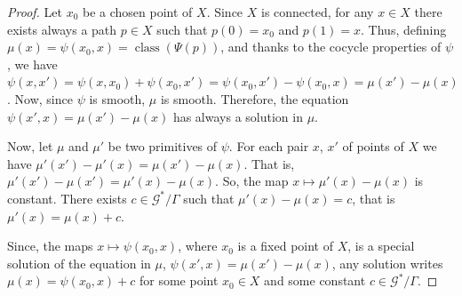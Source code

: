 \documentclass[10pt,reqno,twoside]{amsart}
\newcommand{\cG}{\mathcal{G}}
\DeclareMathOperator{\class}{class}
\theoremstyle{plain}
\theoremstyle{definition}
\begin{document}
  \begin{proof}
    Let $x_0$ be a chosen point of $X$.
    Since $X$ is connected,
    for any $x \in X$ there exists always a path $p \in X$ such that $p(0) = x_0$ and $p(1) = x$.
    Thus,
    defining $\mu(x) = \psi(x_0,x) = \class(\Psi(p))$,
    and thanks to the cocycle properties of $\psi$,
    we have $\psi(x,x') = \psi(x,x_0) + \psi(x_0,x') = \psi(x_0,x') - \psi(x_0,x) = \mu(x') - \mu(x)$.
    Now,
    since $\psi$ is smooth,
    $\mu$ is smooth.
    Therefore,
    the equation $\psi(x',x) = \mu(x') - \mu(x)$ has always a solution in $\mu$.
    
    Now,
    let $\mu$ and $\mu'$ be two primitives of $\psi$.
    For each pair $x$, $x'$ of points of $X$ we have $\mu'(x') - \mu'(x) = \mu(x') - \mu(x)$.
    That is,
    $\mu'(x') - \mu(x') = \mu'(x) - \mu(x)$.
    So,
    the map $x \mapsto \mu'(x) - \mu(x)$ is constant.
    There exists $c \in \cG^*\!/\Gamma$ such that $\mu'(x) - \mu(x) = c$,
    that is $\mu'(x) = \mu(x) + c$.
    
    Since,
    the maps $x \mapsto \psi(x_0,x)$,
    where $x_0$ is a fixed point of $X$,
    is a special solution of the equation in $\mu$,
    $\psi(x',x) = \mu(x') - \mu(x)$,
    any solution writes $\mu(x) = \psi(x_0,x) + c$ for some point $x_0 \in X$ and some constant $c \in \cG^*\!/\Gamma$.
  \end{proof}
  
\end{document}
